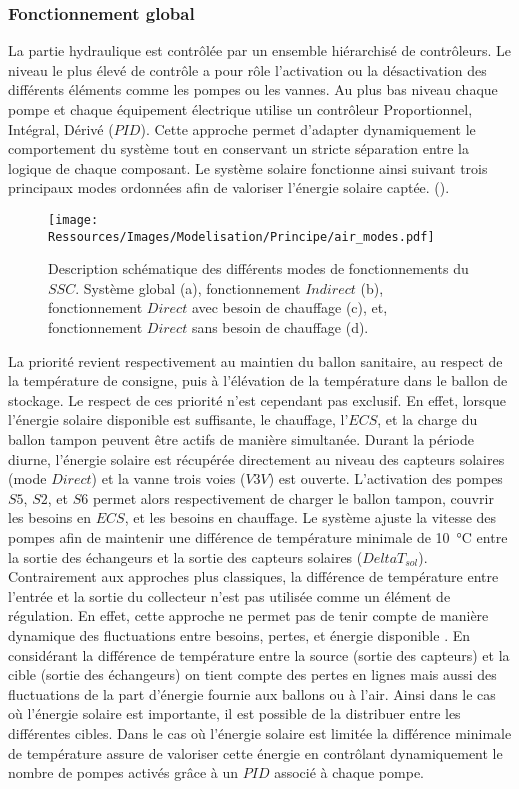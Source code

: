 \subsubsection{Fonctionnement global} %
\label{ssub:fonctionnement_global}
La partie hydraulique est contrôlée par un ensemble hiérarchisé de contrôleurs. Le niveau
le plus élevé de contrôle a pour rôle l’activation ou la désactivation des différents
éléments comme les pompes ou les vannes. Au plus bas niveau chaque pompe et chaque
équipement électrique utilise un contrôleur Proportionnel, Intégral, Dérivé ($PID$). Cette
approche permet d’adapter dynamiquement le comportement du système tout en conservant un
stricte séparation entre la logique de chaque composant. Le système solaire fonctionne
ainsi suivant trois principaux modes ordonnées afin de valoriser l’énergie solaire captée.
().
\begin{figure}
    \centering
    \texttt{[image: Ressources/Images/Modelisation/Principe/air\_modes.pdf]}
    \caption[Description schématique des différents modes de fonctionnements du $SSC$]
    {Description schématique des différents modes de fonctionnements du $SSC$. Système
    global (a), fonctionnement $Indirect$ (b), fonctionnement $Direct$ avec besoin de
    chauffage (c), et, fonctionnement $Direct$ sans besoin de chauffage (d).
             \label{fig:schema_modes}}
\end{figure}

La priorité revient respectivement au maintien du ballon sanitaire, au respect de la température de
consigne, puis à l’élévation de la température dans le ballon de stockage. Le respect de
ces priorité n’est cependant pas exclusif. En effet, lorsque l’énergie solaire disponible est
suffisante, le chauffage, l’$ECS$, et la charge du ballon tampon peuvent être actifs de
manière simultanée.
Durant la période diurne, l’énergie solaire est récupérée directement au niveau des
capteurs solaires (mode $Direct$) et la vanne trois voies ($V3V$) est ouverte.
L’activation des pompes $S5$, $S2$, et $S6$ permet alors respectivement de charger le
ballon tampon, couvrir les besoins en $ECS$, et les besoins en chauffage. Le système
ajuste la vitesse des pompes afin de maintenir une différence de température minimale de
\SI{10}{\celsius} entre la sortie des échangeurs et la sortie des capteurs solaires
($DeltaT_{sol}$). Contrairement aux approches plus classiques, la différence de
température entre l’entrée et la sortie du collecteur n’est pas utilisée comme un élément
de régulation. En effet, cette approche ne permet pas de tenir compte de manière dynamique
des fluctuations entre besoins, pertes, et énergie disponible \parencite{Mosallat2013686}.
En considérant la différence de température entre la source (sortie des capteurs) et la
cible (sortie des échangeurs) on tient compte des pertes en lignes mais aussi des
fluctuations de la part d’énergie fournie aux ballons ou à l’air. Ainsi dans le cas où
l’énergie solaire est importante, il est possible de la distribuer entre les différentes
cibles. Dans le cas où l’énergie solaire est limitée la différence minimale de température
assure de valoriser cette énergie en contrôlant dynamiquement le nombre de pompes activés
grâce à un $PID$ associé à chaque pompe.

